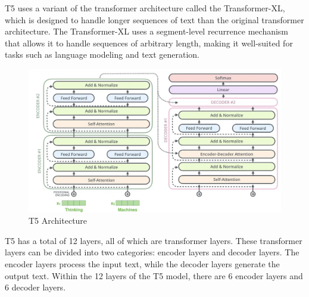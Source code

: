 \documentclass[12pt]{report}
\begin{document}
T5 uses a variant of the transformer architecture called the Transformer-XL, which is designed to handle longer sequences of text than the original transformer architecture. The Transformer-XL uses a segment-level recurrence mechanism that allows it to handle sequences of arbitrary length, making it well-suited for tasks such as language modeling and text generation.

\begin{figure}
    \centering
    \includegraphics[scale = 0.3]{Images/T5.png}
    \caption{T5 Architecture}
    \label{fig:T5 Architecture}
\end{figure}
T5 has a total of 12 layers, all of which are transformer layers. These transformer layers can be divided into two categories: encoder layers and decoder layers. The encoder layers process the input text, while the decoder layers generate the output text. Within the 12 layers of the T5 model, there are 6 encoder layers and 6 decoder layers.
\end{document}
